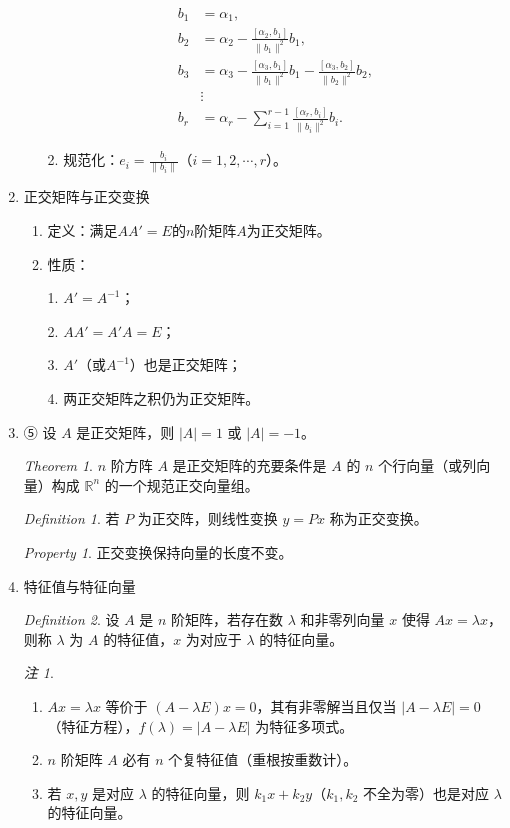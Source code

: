 \documentclass[UTF8]{ctexart}
\theoremstyle{remark}
\newtheorem{remark}{注}
\newtheorem{theorem}{Theorem}
\newtheorem{definition}{Definition}
\newtheorem{property}{Property}
\begin{document}
\begin{enumerate}
\begin{enumerate}
		\begin{align*}
			b_1&=\alpha_1, \\
			b_2&=\alpha_2-\frac{[\alpha_2,b_1]}{\|b_1\|^2}b_1, \\
			b_3&=\alpha_3-\frac{[\alpha_3,b_1]}{\|b_1\|^2}b_1-\frac{[\alpha_3,b_2]}{\|b_2\|^2}b_2, \\
			&\vdots \\
			b_r&=\alpha_r-\sum_{i=1}^{r-1}\frac{[\alpha_r,b_i]}{\|b_i\|^2}b_i.
		\end{align*}
		
		2. 规范化：\(e_i=\frac{b_i}{\|b_i\|}\)（\(i=1,2,\cdots,r\)）。  
	\end{enumerate}  
	
	\item 正交矩阵与正交变换  
	\begin{enumerate}
		\item 定义：满足\(AA'=E\)的\(n\)阶矩阵\(A\)为正交矩阵。  
		\item 性质：  
		
		1. \(A'=A^{-1}\)；  
		
		2. \(AA'=A'A=E\)；  
		
		3. \(A'\)（或\(A^{-1}\)）也是正交矩阵；  
		
		4. 两正交矩阵之积仍为正交矩阵。  
	\end{enumerate}  


\item ⑤ 设 \(A\) 是正交矩阵，则 \(|A| = 1\) 或 \(|A| = -1\)。  
\begin{theorem}
	\(n\) 阶方阵 \(A\) 是正交矩阵的充要条件是 \(A\) 的 \(n\) 个行向量（或列向量）构成 \(\mathbb{R}^n\) 的一个规范正交向量组。
\end{theorem}
\begin{definition}
	若 \(P\) 为正交阵，则线性变换 \(y = Px\) 称为正交变换。
\end{definition}
\begin{property}
	正交变换保持向量的长度不变。
\end{property}

\item 特征值与特征向量
\begin{definition}
	设 \(A\) 是 \(n\) 阶矩阵，若存在数 \(\lambda\) 和非零列向量 \(x\) 使得 \(Ax = \lambda x\)，则称 \(\lambda\) 为 \(A\) 的特征值，\(x\) 为对应于 \(\lambda\) 的特征向量。
\end{definition}
\begin{remark}
	\begin{enumerate}
		\item \(Ax = \lambda x\) 等价于 \((A - \lambda E)x = 0\)，其有非零解当且仅当 \(|A - \lambda E| = 0\)（特征方程），\(f(\lambda) = |A - \lambda E|\) 为特征多项式。
		\item \(n\) 阶矩阵 \(A\) 必有 \(n\) 个复特征值（重根按重数计）。
		\item 若 \(x, y\) 是对应 \(\lambda\) 的特征向量，则 \(k_1x + k_2y\)（\(k_1, k_2\) 不全为零）也是对应 \(\lambda\) 的特征向量。
	\end{enumerate}
\end{remark}


\end{enumerate}
\end{document}
